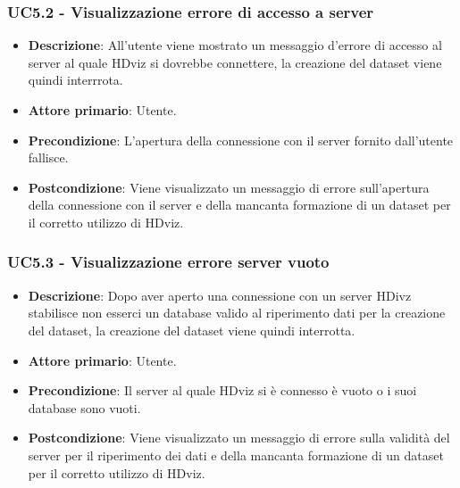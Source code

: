 \subsubsection{UC5.2 - Visualizzazione errore di accesso a server}
\label{subsec:uc5.1.2}
\begin{itemize}
    \item \textbf{Descrizione}: All'utente viene mostrato un messaggio d'errore di accesso
                                al server al quale HDviz si dovrebbe connettere, la creazione del dataset viene quindi interrrota.

    \item \textbf{Attore primario}: Utente.
    
    \item \textbf{Precondizione}:   L'apertura della connessione con il server fornito dall'utente fallisce.

    \item \textbf{Postcondizione}:  Viene visualizzato un messaggio di errore sull'apertura della connessione 
                                    con il server e della mancanta formazione di un dataset per il corretto utilizzo di HDviz.

\end{itemize}



\subsubsection{UC5.3 - Visualizzazione errore server vuoto}
\label{subsec:uc5.1.2}
\begin{itemize}
    \item \textbf{Descrizione}: Dopo aver aperto una connessione con un server HDivz stabilisce non esserci
                                un database valido al riperimento dati per la creazione del dataset, la creazione
                                del dataset viene quindi interrotta.

    \item \textbf{Attore primario}: Utente.
    
    \item \textbf{Precondizione}:   Il server al quale HDviz si è connesso è vuoto o i suoi database sono vuoti.

    \item \textbf{Postcondizione}:   Viene visualizzato un messaggio di errore sulla validità del server per il riperimento
                                    dei dati e della mancanta formazione di un dataset per il corretto utilizzo di HDviz.


\end{itemize}


